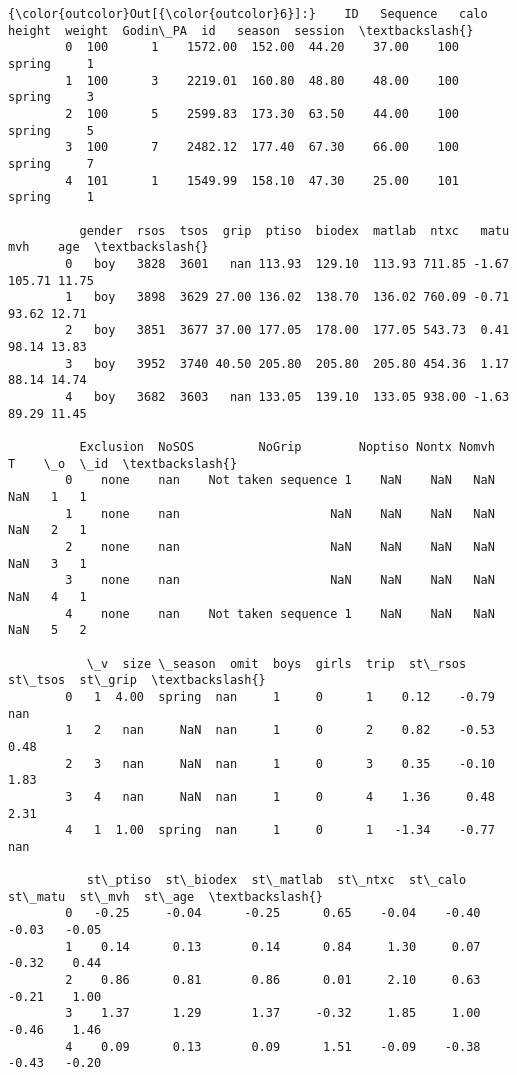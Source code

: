 \documentclass[11pt]{article}
\begin{document}
\begin{Verbatim}[commandchars=\\\{\}]
{\color{outcolor}Out[{\color{outcolor}6}]:}    ID   Sequence   calo   height  weight  Godin\_PA  id   season  session  \textbackslash{}
        0  100      1    1572.00  152.00  44.20    37.00    100  spring     1      
        1  100      3    2219.01  160.80  48.80    48.00    100  spring     3      
        2  100      5    2599.83  173.30  63.50    44.00    100  spring     5      
        3  100      7    2482.12  177.40  67.30    66.00    100  spring     7      
        4  101      1    1549.99  158.10  47.30    25.00    101  spring     1      
        
          gender  rsos  tsos  grip  ptiso  biodex  matlab  ntxc   matu   mvh    age  \textbackslash{}
        0   boy   3828  3601   nan 113.93  129.10  113.93 711.85 -1.67 105.71 11.75   
        1   boy   3898  3629 27.00 136.02  138.70  136.02 760.09 -0.71  93.62 12.71   
        2   boy   3851  3677 37.00 177.05  178.00  177.05 543.73  0.41  98.14 13.83   
        3   boy   3952  3740 40.50 205.80  205.80  205.80 454.36  1.17  88.14 14.74   
        4   boy   3682  3603   nan 133.05  139.10  133.05 938.00 -1.63  89.29 11.45   
        
          Exclusion  NoSOS         NoGrip        Noptiso Nontx Nomvh  T    \_o  \_id  \textbackslash{}
        0    none    nan    Not taken sequence 1    NaN    NaN   NaN  NaN   1   1    
        1    none    nan                     NaN    NaN    NaN   NaN  NaN   2   1    
        2    none    nan                     NaN    NaN    NaN   NaN  NaN   3   1    
        3    none    nan                     NaN    NaN    NaN   NaN  NaN   4   1    
        4    none    nan    Not taken sequence 1    NaN    NaN   NaN  NaN   5   2    
        
           \_v  size \_season  omit  boys  girls  trip  st\_rsos  st\_tsos  st\_grip  \textbackslash{}
        0   1  4.00  spring  nan     1     0      1    0.12    -0.79      nan     
        1   2   nan     NaN  nan     1     0      2    0.82    -0.53     0.48     
        2   3   nan     NaN  nan     1     0      3    0.35    -0.10     1.83     
        3   4   nan     NaN  nan     1     0      4    1.36     0.48     2.31     
        4   1  1.00  spring  nan     1     0      1   -1.34    -0.77      nan     
        
           st\_ptiso  st\_biodex  st\_matlab  st\_ntxc  st\_calo  st\_matu  st\_mvh  st\_age  \textbackslash{}
        0   -0.25     -0.04      -0.25      0.65    -0.04    -0.40    -0.03   -0.05    
        1    0.14      0.13       0.14      0.84     1.30     0.07    -0.32    0.44    
        2    0.86      0.81       0.86      0.01     2.10     0.63    -0.21    1.00    
        3    1.37      1.29       1.37     -0.32     1.85     1.00    -0.46    1.46    
        4    0.09      0.13       0.09      1.51    -0.09    -0.38    -0.43   -0.20    
        

\end{Verbatim}
\end{document}
